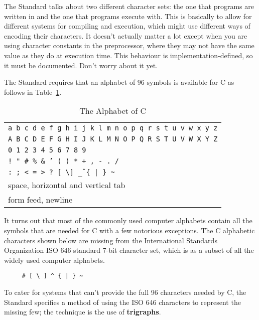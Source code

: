    The Standard talks about two different character sets: the one that
    programs are written in and the one that programs execute with. This is
    basically to allow for different systems for compiling and execution,
    which might use different ways of encoding their characters. It doesn't
    actually matter a lot except when you are using character constants in the
    preprocessor, where they may not have the same value as they do at
    execution time. This behaviour is implementation-defined, so it must be
    documented. Don't worry about it yet.


   The Standard requires that an alphabet of 96 symbols is available
    for C as follows in Table~\ref{tab:alphabetC}.

    \begin{table}[htb]
      \centering
      \begin{tabular}{p{}}
        \toprule
        \texttt{a b c d e f g h i j k l m n o p q r s t u v w x y z}    \\
        \texttt{A B C D E F G H I J K L M N O P Q R S T U V W X Y Z}    \\
        \texttt{0 1 2 3 4 5 6 7 8 9}    \\
        \texttt{! " \# \% \& ' ( ) * + , - . /}    \\
        \texttt{: ; < = > ? [ \textbackslash ] \^ \_ \{ | \} \~}    \\
        space, horizontal and vertical tab    \\
        form feed, newline    \\
        \bottomrule
      \end{tabular}
      \caption{\label{tab:alphabetC}The Alphabet of C}
    \end{table}



   It turns out that most of the commonly used computer alphabets contain
    all the symbols that are needed for C with a few notorious exceptions. The
    C alphabetic characters shown below are missing from the International
    Standards Organization ISO 646 standard 7-bit character set, which is
    as a subset of all the widely used computer alphabets.


   \begin{Verbatim}
     # [ \ ] ^ { | } ~
   \end{Verbatim}

   To cater for systems that can't provide the full 96 characters
    needed by C, the Standard specifies a method of using the
    ISO 646 characters to represent the missing few; the technique is the
    use of \textbf{trigraphs}.


